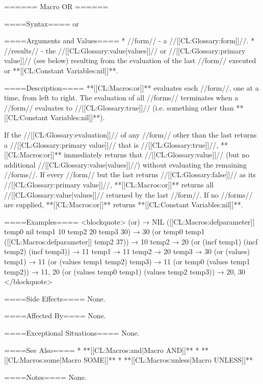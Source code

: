 ====== Macro OR ======

====Syntax====
\DefmacWithValues or {} {}

====Arguments and Values====
  * //form// - a //[[CL:Glossary:form]]//.
  * //results// - the //[[CL:Glossary:value|values]]// or //[[CL:Glossary:primary value]]// (see below) resulting from the evaluation of the last //form// executed or **[[CL:Constant Variables:nil]]**.

====Description====
**[[CL:Macros:or]]** evaluates each //form//, one at a time, from left to right. The evaluation of all //forms// terminates when a //form// evaluates to //[[CL:Glossary:true]]// (i.e. something other than **[[CL:Constant Variables:nil]]**).

If the //[[CL:Glossary:evaluation]]// of any //form// other than the last returns a //[[CL:Glossary:primary value]]// that is //[[CL:Glossary:true]]//, **[[CL:Macros:or]]** immediately returns that //[[CL:Glossary:value]]// (but no additional //[[CL:Glossary:value|values]]//) without evaluating the remaining //forms//. If every //form// but the last returns //[[CL:Glossary:false]]// as its //[[CL:Glossary:primary value]]//, **[[CL:Macros:or]]** returns all //[[CL:Glossary:value|values]]// returned by the last //form//. If no //forms// are supplied, **[[CL:Macros:or]]** returns **[[CL:Constant Variables:nil]]**.

====Examples====
<blockquote> (or) → NIL ([[CL:Macros:defparameter]] temp0 nil temp1 10 temp2 20 temp3 30) → 30 (or temp0 temp1 ([[CL:Macros:defparameter]] temp2 37)) → 10 temp2 → 20 (or (incf temp1) (incf temp2) (incf temp3)) → 11 temp1 → 11 temp2 → 20 temp3 → 30 (or (values) temp1) → 11 (or (values temp1 temp2) temp3) → 11 (or temp0 (values temp1 temp2)) → 11, 20 (or (values temp0 temp1) (values temp2 temp3)) → 20, 30 </blockquote>

====Side Effects====
None.

====Affected By====
None.

====Exceptional Situations====
None.

====See Also====
  * **[[CL:Macros:and|Macro AND]]**
  * **[[CL:Macros:some|Macro SOME]]**
  * **[[CL:Macros:unless|Macro UNLESS]]**

====Notes====
None.

